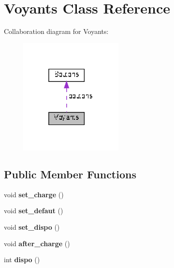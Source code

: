 \hypertarget{classVoyants}{}\section{Voyants Class Reference}
\label{classVoyants}


Collaboration diagram for Voyants\+:
\nopagebreak
\begin{figure}[H]
\begin{center}
\leavevmode
\includegraphics[width=148pt]{classVoyants__coll__graph}
\end{center}
\end{figure}
\subsection*{Public Member Functions}
\begin{DoxyCompactItemize}
\item 
\mbox{\label{classVoyants_a4bb4496af5a52b8e71b24f7196306563}} 
void {\bfseries set\+\_\+charge} ()
\item 
\mbox{\label{classVoyants_a90de83497234a87bc23428b341795571}} 
void {\bfseries set\+\_\+defaut} ()
\item 
\mbox{\label{classVoyants_a4f70cd793d038b760276ffa766097967}} 
void {\bfseries set\+\_\+dispo} ()
\item 
\mbox{\label{classVoyants_a8d6c7d456a456a7760f68f39e7ad778b}} 
void {\bfseries after\+\_\+charge} ()
\item 
\mbox{\label{classVoyants_a5e926e0ed8ec69a09fd1661725c13610}} 
int {\bfseries dispo} ()
\end{DoxyCompactItemize}
